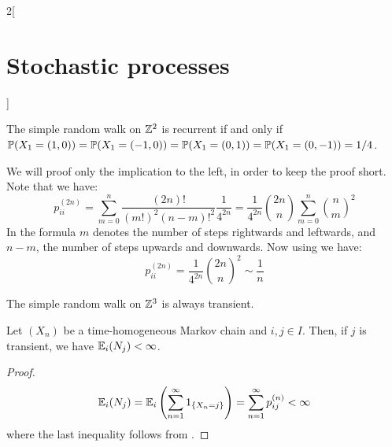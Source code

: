 \documentclass[../../../main_math.tex]{subfiles}
\begin{document}
\begin{multicols}{2}[\section{Stochastic processes}]
  \begin{theorem}
    The simple random walk on $\mathbb{Z}^2$ is recurrent if and only if $\mathbb{P}(X_1=(1,0))=\mathbb{P}(X_1=(-1,0))=\mathbb{P}(X_1=(0,1))=\mathbb{P}(X_1=(0,-1))=1/4$.
  \end{theorem}
  \begin{sproof}
    We will proof only the implication to the left, in order to keep the proof short. Note that we have:
    $$
      p_{ii}^{(2n)}=\sum_{m=0}^{n}\frac{(2n)!}{{(m!)}^2{(n-m)!}^2}\frac{1}{4^{2n}}=\frac{1}{4^{2n}}\binom{2n}{n}\sum_{m=0}^n \binom{n}{m}^2
    $$
    In the formula $m$ denotes the number of steps rightwards and leftwards, and $n-m$, the number of steps upwards and downwards. Now using  we have:
    $$
      p_{ii}^{(2n)}=\frac{1}{4^{2n}}\binom{2n}{n}^2\sim \frac{1}{n}
    $$
  \end{sproof}
  \begin{theorem}
    The simple random walk on $\mathbb{Z}^3$ is always transient.
  \end{theorem}
  \begin{corollary}
    Let $(X_n)$ be a time-homogeneous Markov chain and $i,j\in I$. Then, if $j$ is transient, we have $\mathbb{E}_i(N_j)<\infty$.
  \end{corollary}
  \begin{proof}
    $$
      \mathbb{E}_i(N_j)=\mathbb{E}_i\left(\sum_{n=1}^{\infty}1_{\{X_n=j\}}\right)=\sum_{n=1}^{\infty}p_{ij}^{(n)}<\infty
    $$
    where the last inequality follows from .
  \end{proof}

\end{multicols}
\end{document}

